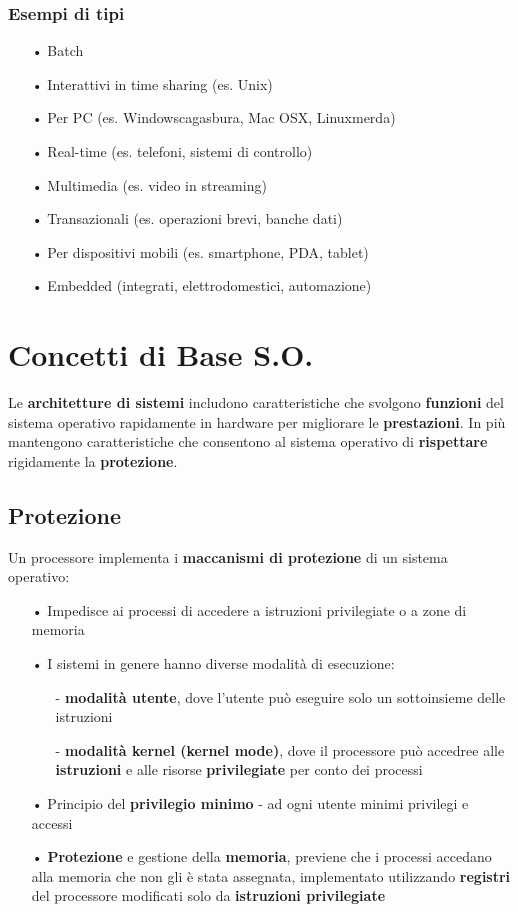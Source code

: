 \documentclass[12pt, letterpaper]{article}
\begin{document}
\subsubsection{Esempi di tipi}
\begin{itemize}
   \item[•] Batch
   \item[•] Interattivi in time sharing (es. Unix)
   \item[•] Per PC (es. Windowscagasbura, Mac OSX, Linuxmerda)
   \item[•] Real-time (es. telefoni, sistemi di controllo)
   \item[•] Multimedia (es. video in streaming)
   \item[•] Transazionali (es. operazioni brevi, banche dati)
   \item[•] Per dispositivi mobili (es. smartphone, PDA, tablet)
   \item[•] Embedded (integrati, elettrodomestici, automazione)
\end{itemize}

\newpage 

\section{Concetti di Base S.O.}

Le \textbf{architetture di sistemi} includono caratteristiche che svolgono \textbf{funzioni} del sistema operativo rapidamente in hardware per migliorare le \textbf{prestazioni}.
In più mantengono caratteristiche che consentono al sistema operativo di \textbf{rispettare} rigidamente la \textbf{protezione}.

\subsection{Protezione}

Un processore implementa i \textbf{maccanismi di protezione} di un sistema operativo:
\begin{itemize}
   \item[•] Impedisce ai processi di accedere a istruzioni privilegiate o a zone di memoria 
   \item[•] I sistemi in genere hanno diverse modalità di esecuzione:
      \begin{itemize}
         \item[-] \textbf{modalità utente}, dove l'utente può eseguire solo un sottoinsieme delle istruzioni 
         \item[-] \textbf{modalità kernel (kernel mode)}, dove il processore può accedree alle \textbf{istruzioni} e alle risorse \textbf{privilegiate} per conto dei processi 
      \end{itemize}
   \item[•] Principio del \textbf{privilegio minimo} - ad ogni utente minimi privilegi e accessi
   \item[•] \textbf{Protezione} e gestione della \textbf{memoria}, previene che i processi accedano alla memoria che non gli è stata assegnata, implementato utilizzando \textbf{registri} del processore modificati solo da \textbf{istruzioni privilegiate}
\end{itemize}
\end{document}
